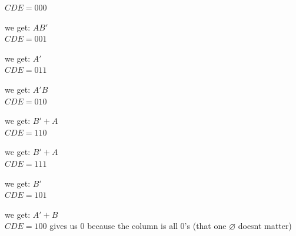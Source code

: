 \documentclass[a4paper,12pt]{article}
\begin{document}
\begin{question}
\begin{subquestion}
\begin{answer}
\(CDE = 000\)\\[0pt]

\begin{center}

\end{center}

we get: \(AB'\)\\[0pt]
\(CDE = 001\)\\[0pt]

\begin{center}

\end{center}

we get: \(A'\)\\[0pt]
\(CDE = 011\)\\[0pt]

\begin{center}

\end{center}

we get: \(A'B\)\\[0pt]
\(CDE = 010\)\\[0pt]

\begin{center}

\end{center}

we get: \(B' + A\)\\[0pt]
\(CDE = 110\)\\[0pt]

\begin{center}

\end{center}

we get: \(B' + A\)\\[0pt]
\(CDE = 111\)\\[0pt]

\begin{center}

\end{center}

we get: \(B'\)\\[0pt]
\(CDE = 101\)\\[0pt]

\begin{center}

\end{center}

we get: \(A' + B\)\\[0pt]
\(CDE = 100\) gives us \(0\) because the column is all \(0\)'s (that one \(\varnothing\) doesnt matter)\\[0pt]

\begin{center}

\end{center}
\end{answer}
\end{subquestion}
\end{question}
\end{document}
